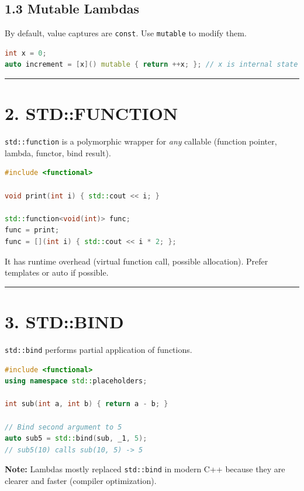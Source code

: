\hypertarget{mutable-lambdas}{%
\subsection{1.3 Mutable Lambdas}\label{mutable-lambdas}}

By default, value captures are \passthrough{\lstinline!const!}. Use
\passthrough{\lstinline!mutable!} to modify them.

\begin{lstlisting}[language={C++}]
int x = 0;
auto increment = [x]() mutable { return ++x; }; // x is internal state
\end{lstlisting}

\begin{center}\rule{0.5\linewidth}{0.5pt}\end{center}

\hypertarget{stdfunction}{%
\section{2. STD::FUNCTION}\label{stdfunction}}

\passthrough{\lstinline!std::function!} is a polymorphic wrapper for
\emph{any} callable (function pointer, lambda, functor, bind result).

\begin{lstlisting}[language={C++}]
#include <functional>

void print(int i) { std::cout << i; }

std::function<void(int)> func;
func = print;
func = [](int i) { std::cout << i * 2; };
\end{lstlisting}

It has runtime overhead (virtual function call, possible allocation).
Prefer templates or auto if possible.

\begin{center}\rule{0.5\linewidth}{0.5pt}\end{center}

\hypertarget{stdbind}{%
\section{3. STD::BIND}\label{stdbind}}

\passthrough{\lstinline!std::bind!} performs partial application of
functions.

\begin{lstlisting}[language={C++}]
#include <functional>
using namespace std::placeholders;

int sub(int a, int b) { return a - b; }

// Bind second argument to 5
auto sub5 = std::bind(sub, _1, 5); 
// sub5(10) calls sub(10, 5) -> 5
\end{lstlisting}

\textbf{Note:} Lambdas mostly replaced
\passthrough{\lstinline!std::bind!} in modern C++ because they are
clearer and faster (compiler optimization).
